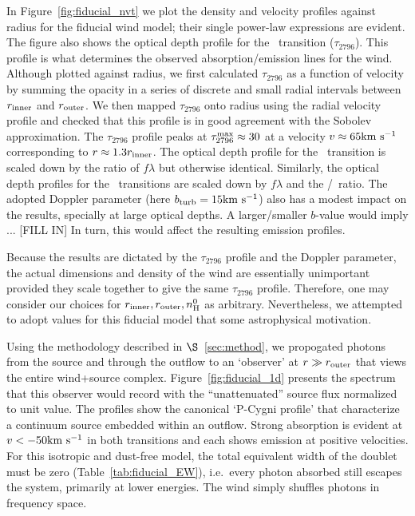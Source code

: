 \documentclass[12pt,preprint]{aastex}
\begin{document}
In Figure~\ref{fig:fiducial_nvt} we plot the density and velocity
profiles against radius for the fiducial wind model;  
their single power-law expressions are evident.  The figure also
shows the optical depth profile for the \mgiia\ transition ($\tau_{2796}$).
This profile is what determines the observed absorption/emission lines
for the wind.  
Although plotted against radius, we first calculated $\tau_{2796}$ 
as a function of velocity by summing the opacity in a series of
discrete and small radial intervals
between $r_{\rm inner}$  and $r_{\rm outer}$.   We then mapped
$\tau_{2796}$ onto radius using the radial velocity profile and 
checked that this profile is in good agreement with
the Sobolev approximation.  
The $\tau_{2796}$ profile peaks at $\tau_{2796}^{\rm max} \approx 30$
at a velocity $v \approx 65 {\rm km~s^{-1}}$ corresponding to $r \approx 1.3
r_{\rm inner}$.  The optical depth profile for the \mgiib\ transition
is scaled down by the ratio of $f\lambda$ but otherwise identical.  Similarly,
the optical depth profiles for the \feiid\ transitions are
scaled down by $f \lambda$ and the \nfe/\nmg\ ratio.  
The adopted Doppler parameter
(here $b_{\rm turb} = 15 {\rm km~s^{-1}}$) also has a modest impact on the results,
specially at large optical depths.  A larger/smaller
$b$-value would imply ... [FILL IN]
In turn, this would affect the resulting emission profiles.

Because the results are dictated by the $\tau_{2796}$ profile and the
Doppler parameter, the actual dimensions and density of the wind are
essentially unimportant provided they scale together to give the same
$\tau_{2796}$ profile.  Therefore, one may consider our choices for
$r_{\rm inner}, r_{\rm outer}, n_{\rm H}^0$ as arbitrary.
Nevertheless, we attempted to adopt values for this fiducial model
that some astrophysical motivation.


Using the methodology described in $\S$~\ref{sec:method}, we
propogated photons from the source and through the outflow to an
`observer' at $r \gg r_{\rm outer}$ that views the entire wind+source
complex.  Figure~\ref{fig:fiducial_1d} presents the spectrum
that this observer would record with the ``unattenuated'' source flux
normalized to unit value.   The  profiles
show the canonical `P-Cygni profile' that characterize a continuum
source embedded within an outflow.  Strong absorption is evident at
$v < -50 {\rm km~s^{-1}}$ in both transitions and each shows emission at
positive velocities.  For this isotropic and dust-free model, the
total equivalent width of the doublet must be zero
(Table~\ref{tab:fiducial_EW}), i.e.\ every photon
absorbed still escapes the system, primarily at lower
energies.  The wind simply shuffles photons in frequency space.
\end{document}

